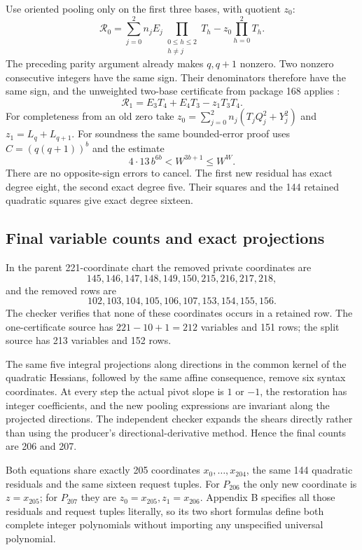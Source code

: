 Use oriented pooling only on the first three bases, with quotient $z_0$:
\[
 \mathcal R_0=
 \sum_{j=0}^{2}n_jE_j\!\prod_{\substack{0\le h\le2\\h\ne j}}T_h
 -z_0\prod_{h=0}^{2}T_h.
\]
The preceding parity argument already makes $q,q+1$ nonzero. Two
nonzero consecutive integers have the same sign. Their denominators
therefore have the same sign, and the unweighted two-base certificate
from package 168 applies \cite{source168}:
\begin{equation}\label{eq:splitpool}
 \mathcal R_1=E_3T_4+E_4T_3-z_1T_3T_4.
\end{equation}
For completeness from an old zero take
$z_0=\sum_{j=0}^{2}n_j(T_jQ_j^2+Y_j^2)$ and
$z_1=L_q+L_{q+1}$. For soundness the same bounded-error proof uses
$C=(q(q+1))^b$ and the estimate
\[
 4\cdot13\,b^{6b}<W^{3b+1}\le W^W.
\]
There are no opposite-sign errors to cancel. The first new residual has
exact degree eight, the second exact degree five. Their squares and the
144 retained quadratic squares give exact degree sixteen.

\subsection{Final variable counts and exact projections}

In the parent 221-coordinate chart the removed private coordinates are
\[
 145,146,147,148,149,150,215,216,217,218,
\]
and the removed rows are
\[
 102,103,104,105,106,107,153,154,155,156.
\]
The checker verifies that none of these coordinates occurs in a
retained row. The one-certificate source has $221-10+1=212$ variables
and 151 rows; the split source has 213 variables and 152 rows.

The same five integral projections along directions in the common
kernel of the quadratic Hessians, followed by the same affine
consequence, remove six syntax coordinates. At every step the actual
pivot slope is $1$ or $-1$, the restoration has integer coefficients,
and the new pooling expressions are invariant along the projected
directions. The independent checker expands the shears directly rather
than using the producer's directional-derivative method. Hence the final
counts are 206 and 207.

Both equations share exactly 205 coordinates $x_0,\ldots,x_{204}$,
the same 144 quadratic residuals and the same sixteen request tuples.
For $P_{206}$ the only new coordinate is $z=x_{205}$; for $P_{207}$
they are $z_0=x_{205},z_1=x_{206}$. Appendix B specifies all those
residuals and request tuples literally, so its two short formulas define
both complete integer polynomials without importing any unspecified
universal polynomial.
